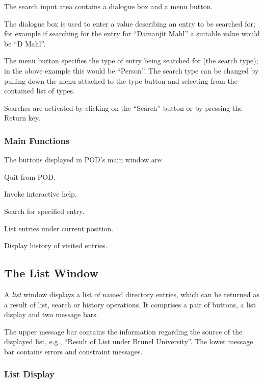 The search input area contains a dialogue box and a menu button.

The dialogue box is used to enter a value describing an entry to be searched
for;
for example if searching for the entry for ``Damanjit Mahl'' a suitable value
would be ``D Mahl''.

The menu button specifies the type of entry being searched for (the search
type);
in the above example this would be ``Person''.
The search type can be changed by pulling down the menu attached to the type
button and selecting from the contained list of types.

Searches are activated by clicking on the ``Search'' button or by pressing the 
Return key.

\subsubsection {Main Functions}

The buttons displayed in POD's main window are:
\begin{describe}
\item [\verb+Quit+:] Quit from POD.
\item [\verb+Help+:] Invoke interactive help.
\item [\verb+Search+:] Search for specified entry.
\item [\verb+List+:] List entries under current position.
\item [\verb+History+:] Display history of visited entries.
\end{describe}
	
\subsection {The List Window}

A {\em list} window displays a list of named directory entries,
which can be returned as a result of list,
search or history operations.
It comprises a pair of buttons,
a list display and two message bars.

The upper message bar contains the information regarding the source of the
displayed list, e.g., ``Result of List under Brunel University''.
The lower message bar contains errors and constraint messages.

\subsubsection {List Display}

